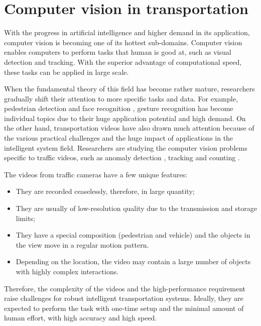 \section{Computer vision in transportation}
\label{sec:intro-cv}

With the progress in artificial intelligence and higher demand in its application, computer vision is becoming one of its hottest sub-domains. 
Computer vision enables computers to perform tasks that human is good at, such as visual detection and tracking. 
With the superior advantage of computational speed, these tasks can be applied in large scale.

When the fundamental theory of this field has become rather mature, researchers gradually shift their attention to more specific tasks and data. For example, pedestrian detection \cite{dollar2012pedestrian} and face recognition \cite{parkhi2015deep}, gesture recognition \cite{rautaray2015vision} has become individual topics due to their huge application potential and high demand.
On the other hand, transportation videos have also drawn much attention because of the various practical challenges and the huge impact of applications in the intelligent system field. 
Researchers are studying the computer vision problems specific to traffic videos, such as anomaly detection \cite{scime2018anomaly}, tracking \cite{wu2015object} and counting \cite{seenouvong2016computer}. 

The videos from traffic cameras have a few unique features: 
\begin{itemize}
\item They are recorded ceaselessly, therefore, in large quantity; 
\item They are usually of low-resolution quality due to the transmission and storage limits;
\item They have a special composition (pedestrian and vehicle) and the objects in the view move in a regular motion pattern.
\item Depending on the location, the video may contain a large number of objects with highly complex interactions.
\end{itemize}

Therefore, the complexity of the videos and the high-performance requirement raise challenges for robust intelligent transportation systems. 
Ideally, they are expected to perform the task with one-time setup and the minimal amount of human effort, with high accuracy and high speed.